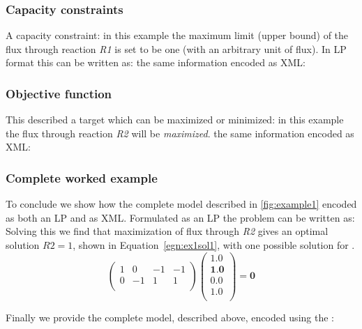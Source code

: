 \subsubsection{Capacity constraints}
\label{examples1:fluxbound}
A capacity constraint: in this example the maximum limit (upper bound) of the flux through reaction \textit{R1} is set to be one (with an arbitrary unit of flux). In LP format this can be written as:
%
%
the same information encoded as XML:
%

\subsubsection{Objective function}
\label{examples1:objfunc}
This described a target which can be maximized or minimized: in this example the flux through reaction \textit{R2} will be \textit{maximized}.
%
%
the same information encoded as XML:
%

\subsubsection{Complete worked example}
\label{examples1:complete}
To conclude we show how the complete model described in \ref{fig:example1} encoded as both an LP and as XML. Formulated as an LP the problem can be written as:
%
%
Solving this we find that maximization of flux through \textit{R2}
gives an optimal solution $R2 = 1$, shown in Equation~\ref{egn:ex1sol1}, with one possible solution
for \Jvec.
\begin{equation}\label{egn:ex1sol1}
  \left(
    \begin{array}{cccc}
        1 &  0 & -1 & -1 \\
        0 & -1 &  1 &  1 \\
    \end{array}
  \right)
  \left(
    \begin{array}{c}
        1.0 \\
        \textbf{1.0} \\
        0.0 \\
        1.0 \\
    \end{array}
  \right)
  = \textbf{0}
\end{equation}

Finally we provide the complete model, described above, encoded using the \FBCPackage:
%
